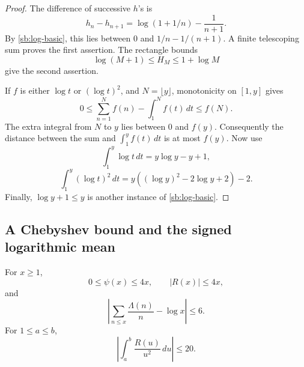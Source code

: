\begin{proof}
The difference of successive $h$'s is
\[
 h_n-h_{n+1}=\log(1+1/n)-\frac1{n+1}.
\]
By \eqref{sb:log-basic}, this lies between $0$ and
$1/n-1/(n+1)$.  A finite telescoping sum proves the first assertion.
The rectangle bounds
\[
 \log(M+1)\le H_M\le1+\log M
\]
give the second assertion.

If $f$ is either $\log t$ or $(\log t)^2$, and $N=\lfloor y\rfloor$,
monotonicity on $[1,y]$ gives
\[
 0\le\sum_{n=1}^N f(n)-\int_1^N f(t)\,dt\le f(N).
\]
The extra integral from $N$ to $y$ lies between $0$ and $f(y)$.
Consequently the distance between the sum and $\int_1^y f(t)\,dt$
is at most $f(y)$.  Now use
\[
 \int_1^y\log t\,dt=y\log y-y+1,
\]
\[
 \int_1^y(\log t)^2\,dt
    =y((\log y)^2-2\log y+2)-2.
\]
Finally, $\log y+1\le y$ is another instance of
\eqref{sb:log-basic}.
\end{proof}

\subsection{A Chebyshev bound and the signed logarithmic mean}
\label{sb:chebyshev}

\begin{lemma}
\label{sb:basic-psi}
For $x\ge1$,
\begin{equation}
 0\le\psi(x)\le4x,\qquad |R(x)|\le4x,
 \label{sb:chebyshev-bound}
\end{equation}
and
\begin{equation}
 \left|\sum_{n\le x}\frac{\Lambda(n)}n-\log x\right|\le6.
 \label{sb:mertens-bound}
\end{equation}
For $1\le a\le b$,
\begin{equation}
 \left|\int_a^b\frac{R(u)}{u^2}\,du\right|\le20.
 \label{sb:signed-integral}
\end{equation}
\end{lemma}

